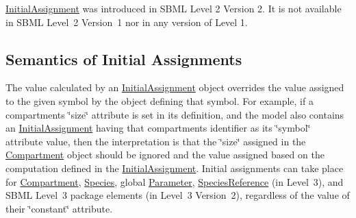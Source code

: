 \hyperlink{class_initial_assignment}{Initial\+Assignment} was introduced in S\+B\+ML Level 2 Version 2. It is not available in S\+B\+ML Level~2 Version~1 nor in any version of Level 1.\hypertarget{class_initial_assignment_initassign-semantics}{}\subsection{Semantics of Initial Assignments}\label{class_initial_assignment_initassign-semantics}
The value calculated by an \hyperlink{class_initial_assignment}{Initial\+Assignment} object overrides the value assigned to the given symbol by the object defining that symbol. For example, if a compartment\textquotesingle{}s \char`\"{}size\char`\"{} attribute is set in its definition, and the model also contains an \hyperlink{class_initial_assignment}{Initial\+Assignment} having that compartment\textquotesingle{}s identifier as its \char`\"{}symbol\char`\"{} attribute value, then the interpretation is that the \char`\"{}size\char`\"{} assigned in the \hyperlink{class_compartment}{Compartment} object should be ignored and the value assigned based on the computation defined in the \hyperlink{class_initial_assignment}{Initial\+Assignment}. Initial assignments can take place for \hyperlink{class_compartment}{Compartment}, \hyperlink{class_species}{Species}, global \hyperlink{class_parameter}{Parameter}, \hyperlink{class_species_reference}{Species\+Reference} (in Level~3), and S\+B\+ML Level~3 package elements (in Level~3 Version~2), regardless of the value of their \char`\"{}constant\char`\"{} attribute.

